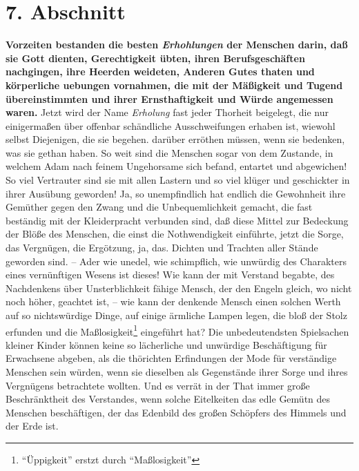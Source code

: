 \section{7. Abschnitt} \label{kap14_ab7}

 \textbf{Vorzeiten bestanden die besten \textit{Erhohlungen} der Menschen darin, daß sie Gott
dienten, Gerechtigkeit übten, ihren Berufsgeschäften nachgingen, ihre Heerden
weideten, Anderen Gutes thaten und körperliche uebungen vornahmen, die mit der
Mäßigkeit und Tugend übereinstimmten und ihrer Ernsthaftigkeit und Würde
angemessen waren.} Jetzt wird der Name \textit{Erholung} fast jeder Thorheit
beigelegt, die nur einigermaßen über offenbar schändliche Ausschweifungen
erhaben ist, wiewohl selbst Diejenigen, die sie begehen. darüber erröthen
müssen, wenn sie bedenken, was sie gethan haben. So weit sind die Menschen sogar
von dem Zustande, in welchem Adam nach feinem Ungehorsame sich befand, entartet
und abgewichen! So viel Vertrauter sind sie mit allen Lastern und so viel klüger
und geschickter in ihrer Ausübung geworden! Ja, so unempfindlich hat endlich die
Gewohnheit ihre Gemüther gegen den Zwang und die Unbequemlichkeit gemacht, die
fast beständig mit der Kleiderpracht verbunden sind, daß diese Mittel zur
Bedeckung der Blöße des Menschen, die einst die Nothwendigkeit einführte, jetzt
die Sorge, das Vergnügen, die Ergötzung, ja, das. Dichten und Trachten aller
Stände geworden sind. -- Ader wie unedel, wie schimpflich, wie unwürdig des
Charakters eines vernünftigen Wesens ist dieses! Wie kann der mit Verstand
begabte, des Nachdenkens über Unsterblichkeit fähige Mensch, der den Engeln
gleich, wo nicht noch höher, geachtet ist, -- wie kann der denkende Mensch einen
solchen Werth auf so nichtswürdige Dinge, auf einige ärmliche Lampen legen, die
bloß der Stolz erfunden und die Maßlosigkeit\footnote{"`Üppigkeit"' erstzt durch "`Maßlosigkeit"'} eingeführt hat? Die unbedeutendsten
Spielsachen kleiner Kinder können keine so lächerliche und unwürdige
Beschäftigung für Erwachsene abgeben, als die thörichten Erfindungen der Mode
für verständige Menschen sein würden, wenn sie dieselben als Gegenstände ihrer
Sorge und ihres Vergnügens betrachtete wollten. Und es verrät in der That immer
große Beschränktheit des Verstandes, wenn solche Eitelkeiten das edle Gemütn des
Menschen beschäftigen, der das Edenbild des großen Schöpfers des Himmels und der
Erde ist.

